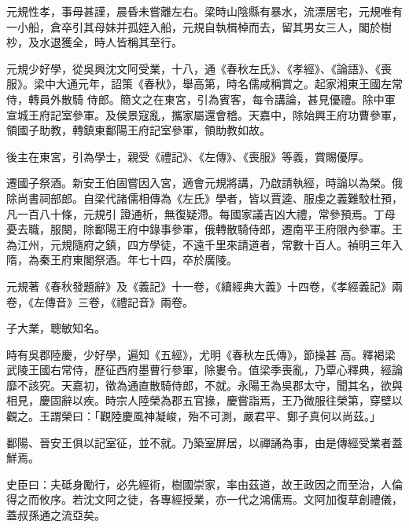 \begin{pinyinscope}
 元規性孝，事母甚謹，晨昏未嘗離左右。梁時山陰縣有暴水，流漂居宅，元規唯有一小船，倉卒引其母妹并孤姪入船，元規自執楫棹而去，留其男女三人，閣於樹杪，及水退獲全，時人皆稱其至行。



 元規少好學，從吳興沈文阿受業，十八，通《春秋左氏》、《孝經》、《論語》、《喪服》。梁中大通元年，詔策《春秋》，舉高第，時名儒咸稱賞之。起家湘東王國左常侍，轉員外散騎
 侍郎。簡文之在東宮，引為賓客，每令講論，甚見優禮。除中軍宣城王府記室參軍。及侯景寇亂，攜家屬還會稽。天嘉中，除始興王府功曹參軍，領國子助教，轉鎮東鄱陽王府記室參軍，領助教如故。



 後主在東宮，引為學士，親受《禮記》、《左傳》、《喪服》等義，賞賜優厚。



 遷國子祭酒。新安王伯固嘗因入宮，適會元規將講，乃啟請執經，時論以為榮。俄除尚書祠部郎。自梁代諸儒相傳為《左氏》學者，皆以賈逵、服虔之義難駮杜預，凡一百八十條，元規引
 證通析，無復疑滯。每國家議吉凶大禮，常參預焉。丁母憂去職，服闋，除鄱陽王府中錄事參軍，俄轉散騎侍郎，遷南平王府限內參軍。王為江州，元規隨府之鎮，四方學徒，不遠千里來請道者，常數十百人。禎明三年入隋，為秦王府東閣祭酒。年七十四，卒於廣陵。



 元規著《春秋發題辭》及《義記》十一卷，《續經典大義》十四卷，《孝經義記》兩卷，《左傳音》三卷，《禮記音》兩卷。



 子大業，聰敏知名。



 時有吳郡陸慶，少好學，遍知《五經》，尤明《春秋左氏傳》，節操甚
 高。釋褐梁武陵王國右常侍，歷征西府墨曹行參軍，除婁令。值梁季喪亂，乃覃心釋典，經論靡不該究。天嘉初，徵為通直散騎侍郎，不就。永陽王為吳郡太守，聞其名，欲與相見，慶固辭以疾。時宗人陸榮為郡五官掾，慶嘗詣焉，王乃微服往榮第，穿壁以觀之。王謂榮曰：「觀陸慶風神凝峻，殆不可測，嚴君平、鄭子真何以尚茲。」



 鄱陽、晉安王俱以記室征，並不就。乃築室屏居，以禪誦為事，由是傳經受業者蓋鮮焉。



 史臣曰：夫砥身勵行，必先經術，樹國崇家，率由茲道，故王政因之而至治，人倫得之而攸序。若沈文阿之徒，各專經授業，亦一代之鴻儒焉。文阿加復草創禮儀，蓋叔孫通之流亞矣。






\end{pinyinscope}